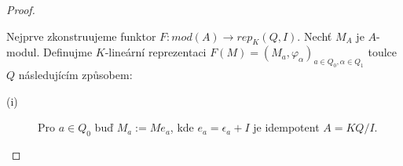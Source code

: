     \begin{proof}
      \begin{description}
        \item 
        
        \item[(1)] Nejprve zkonstruujeme funktor $F:mod(A)\to rep_K(Q,I)$. Nechť 
          $M_A$ je $A$-modul. Definujme $K$-lineární reprezentaci
           $F(M)=(M_a, \varphi_\alpha)_{a\in Q_0, \alpha\in Q_1}$
            toulce $Q$ 
          následujícím způsobem: 
          
            \begin{description}
              \item[(i)] Pro $a\in Q_0$ buď $M_a:=Me_a$, kde $e_a=\epsilon_a+I$ 
              je idempotent $A=KQ/I$.
              

\end{description}
\end{description}
\end{proof}
